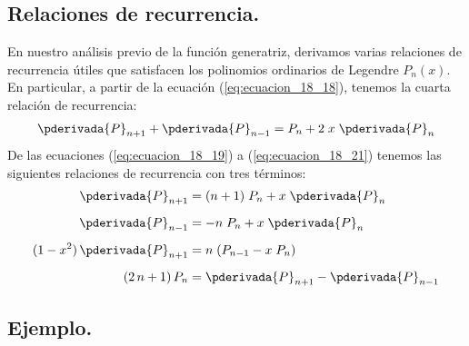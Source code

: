 \subsection{Relaciones de recurrencia.}

En nuestro análisis previo de la función generatriz, derivamos varias relaciones de recurrencia útiles que satisfacen los polinomios ordinarios de Legendre $P_{n} (x)$. En particular, a partir de la ecuación (\ref{eq:ecuacion_18_18}), tenemos la cuarta relación de recurrencia:
\begin{align*}
\pderivada{P}_{n+1} + \pderivada{P}_{n-1} =  P_{n} + 2 \; x \; \pderivada{P}_{n}
\end{align*}
De las ecuaciones (\ref{eq:ecuacion_18_19}) a (\ref{eq:ecuacion_18_21}) tenemos las siguientes relaciones de recurrencia con tres términos:
\begin{align*}
\pderivada{P}_{n+1} &= (n+1) \; P_{n} + x \; \pderivada{P}_{n} \\[0.5em]
\pderivada{P}_{n-1} &= -n \; P_{n} + x \; \pderivada{P}_{n} \\[0.5em]
(1 - x^{2}) \, \pderivada{P}_{n+1} &= n \; (P_{n-1} - x \; P_{n}) \\[0.5em]
(2 \, n + 1) \, P_{n} &= \pderivada{P}_{n+1} - \pderivada{P}_{n-1}
\end{align*}

\subsection{Ejemplo.}

